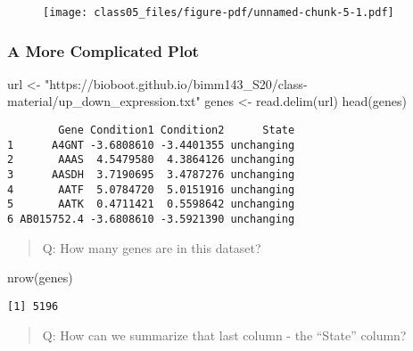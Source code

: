 \documentclass[
  letterpaper,
  DIV=11,
  numbers=noendperiod]{scrartcl}
\newenvironment{Shaded}{\begin{snugshade}}{\end{snugshade}}
\newcommand{\FunctionTok}[1]{\textcolor[rgb]{0.28,0.35,0.67}{#1}}
\newcommand{\NormalTok}[1]{\textcolor[rgb]{0.00,0.23,0.31}{#1}}
\newcommand{\OtherTok}[1]{\textcolor[rgb]{0.00,0.23,0.31}{#1}}
\newcommand{\SpecialCharTok}[1]{\textcolor[rgb]{0.37,0.37,0.37}{#1}}
\newcommand{\StringTok}[1]{\textcolor[rgb]{0.13,0.47,0.30}{#1}}
\begin{document}
\begin{figure}[H]

{\centering \texttt{[image: class05\_files/figure-pdf/unnamed-chunk-5-1.pdf]}

}

\end{figure}

\hypertarget{a-more-complicated-plot}{%
\subsubsection{A More Complicated Plot}\label{a-more-complicated-plot}}

\begin{Shaded}
\begin{Highlighting}[]
\NormalTok{url }\OtherTok{\textless{}{-}} \StringTok{"https://bioboot.github.io/bimm143\_S20/class{-}material/up\_down\_expression.txt"}
\NormalTok{genes }\OtherTok{\textless{}{-}} \FunctionTok{read.delim}\NormalTok{(url)}
\FunctionTok{head}\NormalTok{(genes)}
\end{Highlighting}
\end{Shaded}

\begin{verbatim}
        Gene Condition1 Condition2      State
1      A4GNT -3.6808610 -3.4401355 unchanging
2       AAAS  4.5479580  4.3864126 unchanging
3      AASDH  3.7190695  3.4787276 unchanging
4       AATF  5.0784720  5.0151916 unchanging
5       AATK  0.4711421  0.5598642 unchanging
6 AB015752.4 -3.6808610 -3.5921390 unchanging
\end{verbatim}

\begin{quote}
Q: How many genes are in this dataset?
\end{quote}

\begin{Shaded}
\begin{Highlighting}[]
\FunctionTok{nrow}\NormalTok{(genes)}
\end{Highlighting}
\end{Shaded}

\begin{verbatim}
[1] 5196
\end{verbatim}

\begin{quote}
Q: How can we summarize that last column - the ``State'' column?
\end{quote}

\begin{Shaded}
\end{Shaded}
\end{document}
